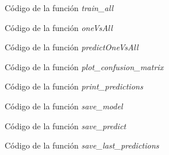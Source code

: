 \documentclass[6pt]{../../shared/AiTex}
\begin{document}
\begin{figure}[H]
    \centering
    
    \caption{Código de la función \textit{train\_all}}
    \label{fig:train_all}
\end{figure}

\begin{figure}[H]
    \centering
    
    \caption{Código de la función \textit{oneVsAll}}
    \label{fig:oneVsAll}
\end{figure}

\begin{figure}[H]
    \centering
    
    \caption{Código de la función \textit{predictOneVsAll}}
    \label{fig:predictOneVsAll}
\end{figure}

\begin{figure}[H]
    \centering
    
    \caption{Código de la función \textit{plot\_confusion\_matrix}}
    \label{fig:plot_confusion_matrix}
\end{figure}


\begin{figure}[H]
    \centering
    
    \caption{Código de la función \textit{print\_predictions}}
    \label{fig:print_predictions}
\end{figure}

\begin{figure}[H]
    \centering
    
    \caption{Código de la función \textit{save\_model}}
    \label{fig:save_model}
\end{figure}

\begin{figure}[H]
    \centering
    
    \caption{Código de la función \textit{save\_predict}}
    \label{fig:save_predict}
\end{figure}

\begin{figure}[H]
    \centering
    
    \caption{Código de la función \textit{save\_last\_predictions}}
    \label{fig:save_last_prediction}
\end{figure}
\end{document}

